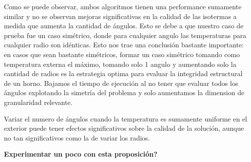 Como se puede observar, ambos algoritmos tienen una performance sumamente similar y no se observan mejoras significativas en la calidad de las isotermas a medida que aumenta la cantidad de ángulos. Esto se debe a que nuestro caso de prueba fue un caso simétrico, donde para cualquier angulo las temperaturas para cualquier radio son idénticas. Esto nos trae una conclusión bastante importante: en casos que sean bastante simétricos, formar un caso simétrico tomando como temperatura externa el máximo, tomando solo 1 angulo y aumentando solo la cantidad de radios es la estrategia optima para evaluar la integridad estructural de un horno. Bajamos el tiempo de ejecución al no tener que evaluar todos los ángulos explotando la simetría del problema y solo aumentamos la dimension de granularidad relevante.

Variar el numero de ángulos cuando la temperatura es sumamente uniforme en el exterior puede tener efectos significativos sobre la calidad de la solución, aunque no tan significativos como la de variar los radios.

\textbf{Experimentar un poco con esta proposición?}

